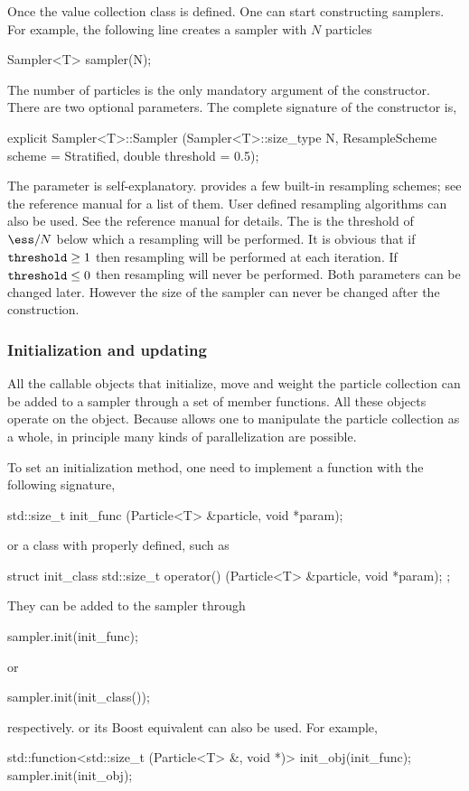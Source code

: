 Once the value collection class  is defined. One can start
constructing \smc samplers. For example, the following line creates a sampler
with $N$ particles
\begin{cppcode}
Sampler<T> sampler(N);
\end{cppcode}
The number of particles is the only mandatory argument of the constructor.
There are two optional parameters. The complete signature of the constructor
is,
\begin{cppcode}
explicit Sampler<T>::Sampler (Sampler<T>::size_type N,
        ResampleScheme scheme = Stratified, double threshold = 0.5);
\end{cppcode}
The  parameter is self-explanatory. \vsmc provides a few built-in
resampling schemes; see the reference manual for a list of them. User defined
resampling algorithms can also be used. See the reference manual for details.
The  is the threshold of $\ess/N$ below which a resampling
will be performed. It is obvious that if $\text{\code{threshold}}\ge1$ then
resampling will be performed at each iteration. If
$\text{\code{threshold}}\le0$ then resampling will never be performed. Both
parameters can be changed later. However the size of the sampler can never be
changed after the construction.

\subsubsection{Initialization and updating}

All the callable objects that initialize, move and weight the particle
collection can be added to a sampler through a set of member functions. All
these objects operate on the  object. Because \vsmc
allows one to manipulate the particle collection as a whole, in principle many
kinds of parallelization are possible.

To set an initialization method, one need to implement a function with the
following signature,
\begin{cppcode}
std::size_t init_func (Particle<T> &particle, void *param);
\end{cppcode}
or a class with  properly defined, such as
\begin{cppcode}
struct init_class
{ std::size_t operator() (Particle<T> &particle, void *param); };
\end{cppcode}
They can be added to the sampler through
\begin{cppcode}
sampler.init(init_func);
\end{cppcode}
or
\begin{cppcode}
sampler.init(init_class());
\end{cppcode}
respectively. \cppoo{}  or its Boost equivalent
 can also be used. For example,
\begin{cppcode}
std::function<std::size_t (Particle<T> &, void *)> init_obj(init_func);
sampler.init(init_obj);
\end{cppcode}

